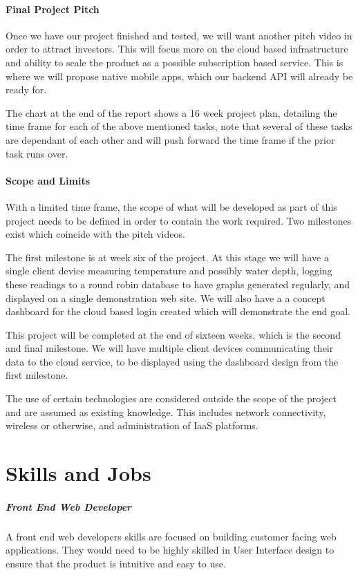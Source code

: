 \documentclass[11pt, oneside, a4paper, titlepage]{article}
\begin{document}
\subsection{Final Project Pitch}
Once we have our project finished and tested, we will want another pitch video in order to attract investors.  This will focus more on the cloud based infrastructure and ability to scale the product as a possible subscription based service.  This is where we will propose native mobile apps, which our backend API will already be ready for.  

The chart at the end of the report shows a 16 week project plan, detailing the time frame for each of the above mentioned tasks, note that several of these tasks are dependant of each other and will push forward the time frame if the prior task runs over. 

\subsection{Scope and Limits}
With a limited time frame, the scope of what will be developed as part of this project needs to be defined in order to contain the work required.  Two milestones exist which coincide with the pitch videos.   

The first milestone is at week six of the project. At this stage we will have a single client device measuring temperature and possibly water depth, logging these readings to a round robin database to have graphs generated regularly, and displayed on a single demonstration web site.  We will also have a a concept dashboard for the cloud based login created which will demonstrate the end goal. 

This project will be completed at the end of sixteen weeks, which is the second and final milestone. We will have multiple client devices communicating their data to the cloud service, to be displayed using the dashboard design from the first milestone.  

The use of certain technologies are considered outside the scope of the project and are assumed as existing knowledge.  This includes network connectivity, wireless or otherwise, and administration of IaaS platforms. 


\part{Skills and Jobs}
\subsubsection{Front End Web Developer}
A front end web developers skills are focused on building customer facing web applications. They would need to be highly skilled in User Interface design to ensure that the product is intuitive and easy to use. 
\end{document}
